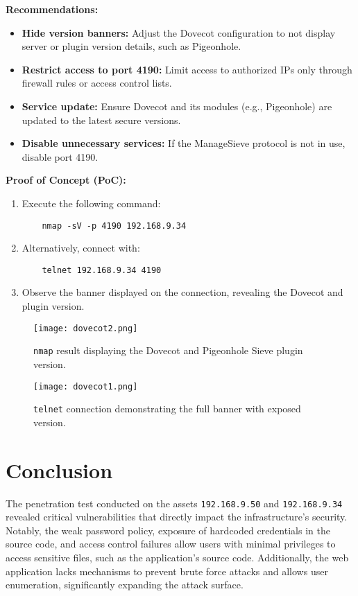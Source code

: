 \documentclass[a4paper,12pt]{article}
\begin{document}
\textbf{Recommendations:}  
\begin{itemize}
    \item \textbf{Hide version banners:} Adjust the Dovecot configuration to not display server or plugin version details, such as Pigeonhole.  
    \item \textbf{Restrict access to port 4190:} Limit access to authorized IPs only through firewall rules or access control lists.  
    \item \textbf{Service update:} Ensure Dovecot and its modules (e.g., Pigeonhole) are updated to the latest secure versions.  
    \item \textbf{Disable unnecessary services:} If the ManageSieve protocol is not in use, disable port 4190.  
\end{itemize}

\textbf{Proof of Concept (PoC):}  
\begin{enumerate}
    \item Execute the following command:
    \begin{verbatim}
    nmap -sV -p 4190 192.168.9.34
    \end{verbatim}
    \item Alternatively, connect with:
    \begin{verbatim}
    telnet 192.168.9.34 4190
    \end{verbatim}
    \item Observe the banner displayed on the connection, revealing the Dovecot and plugin version.
\end{enumerate}

\begin{figure}[H]
    \centering
    \texttt{[image: dovecot2.png]}
    \caption{\texttt{nmap} result displaying the Dovecot and Pigeonhole Sieve plugin version.}
\end{figure}

\begin{figure}[H]
    \centering
    \texttt{[image: dovecot1.png]}
    \caption{\texttt{telnet} connection demonstrating the full banner with exposed version.}
\end{figure}

\clearpage

\section{Conclusion}

The penetration test conducted on the assets \texttt{192.168.9.50} and \texttt{192.168.9.34} revealed critical vulnerabilities that directly impact the infrastructure's security. Notably, the weak password policy, exposure of hardcoded credentials in the source code, and access control failures allow users with minimal privileges to access sensitive files, such as the application's source code. Additionally, the web application lacks mechanisms to prevent brute force attacks and allows user enumeration, significantly expanding the attack surface.
\end{document}
